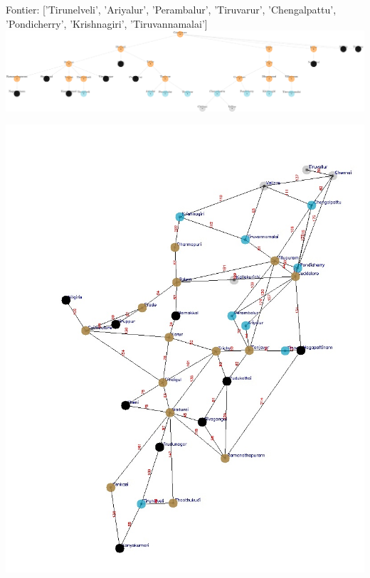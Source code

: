 \documentclass[xcolor=table]{beamer}
\begin{document}
\begin{frame}
  { \tiny Fontier: ['Tirunelveli', 'Ariyalur', 'Perambalur', 'Tiruvarur', 'Chengalpattu', 'Pondicherry', 'Krishnagiri', 'Tiruvannamalai']}
  \includegraphics[width=1\textwidth]{../BFSNodes/34-1.png}
  \begin{center}
    \includegraphics[height=0.6\textheight]{../BFSoutput/tamilBFS32.jpg}
  \end{center}
\end{frame}
\end{document}
